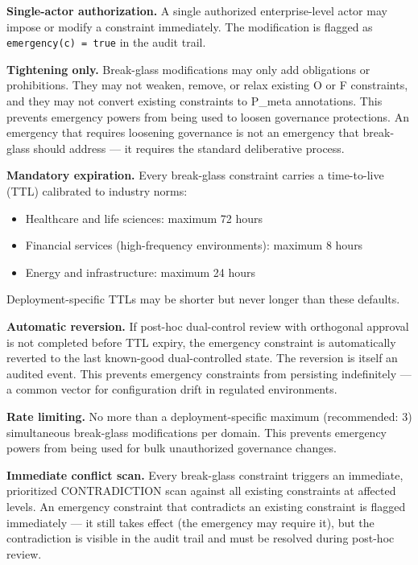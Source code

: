 \textbf{Single-actor authorization.} A single authorized enterprise-level actor may impose or modify a constraint immediately. The modification is flagged as \texttt{emergency(c) = true} in the audit trail.

\textbf{Tightening only.} Break-glass modifications may only add obligations or prohibitions. They may not weaken, remove, or relax existing O or F constraints, and they may not convert existing constraints to P\_\allowbreak{}meta annotations. This prevents emergency powers from being used to loosen governance protections. An emergency that requires loosening governance is not an emergency that break-glass should address --- it requires the standard deliberative process.

\textbf{Mandatory expiration.} Every break-glass constraint carries a time-to-live (TTL) calibrated to industry norms:

\begin{itemize}
  \item Healthcare and life sciences: maximum 72 hours
  \item Financial services (high-frequency environments): maximum 8 hours
  \item Energy and infrastructure: maximum 24 hours
\end{itemize}


Deployment-specific TTLs may be shorter but never longer than these defaults.

\textbf{Automatic reversion.} If post-hoc dual-control review with orthogonal approval is not completed before TTL expiry, the emergency constraint is automatically reverted to the last known-good dual-controlled state. The reversion is itself an audited event. This prevents emergency constraints from persisting indefinitely --- a common vector for configuration drift in regulated environments.

\textbf{Rate limiting.} No more than a deployment-specific maximum (recommended: 3) simultaneous break-glass modifications per domain. This prevents emergency powers from being used for bulk unauthorized governance changes.

\textbf{Immediate conflict scan.} Every break-glass constraint triggers an immediate, prioritized CONTRADICTION scan against all existing constraints at affected levels. An emergency constraint that contradicts an existing constraint is flagged immediately --- it still takes effect (the emergency may require it), but the contradiction is visible in the audit trail and must be resolved during post-hoc review.

